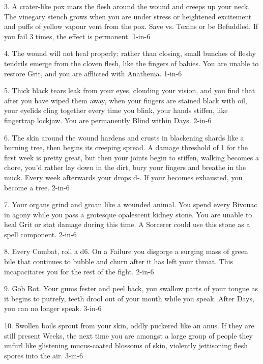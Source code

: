 3. A crater-like pox mars the flesh around the wound and creeps up your neck. The vinegary stench grows when you are under stress or heightened excitement and puffs of yellow vapour vent from the pox. Save vs. Toxins or be Befuddled.  If you fail 3 times, the effect is permanent. 1-in-6




4. The wound will not heal properly; rather than closing, small bunches of fleshy tendrils emerge from the cloven flesh, like the fingers of babies.  You are unable to restore Grit, and you are afflicted with Anathema. 1-in-6



5. Thick black tears leak from your eyes, clouding your vision, and you find that after you have wiped them away, when your fingers are stained black with oil, your eyelids cling together every time you blink, your hands stiffen, like fingertrap lockjaw.  You are permanently Blind within Days. 2-in-6



6. The skin around the wound hardens and crusts in blackening shards like a burning tree, then begins its creeping spread. A damage threshold of 1 for the first week is pretty great, but then your joints begin to stiffen, walking becomes a chore, you'd rather lay down in the dirt, bury your fingers and breathe in the muck. Every week afterwards your \MD drops {d-}.  If your \MD becomes exhausted, you become a tree. 2-in-6



7. Your organs grind and groan like a wounded animal. You spend every Bivouac in agony while you pass a grotesque opalescent kidney stone. You are unable to heal Grit or stat damage during this time. A Sorcerer could use this stone as a spell component. 2-in-6



8. Every Combat, roll a d6.  On a Failure you disgorge a surging mass of green bile that continues to bubble and churn after it has left your throat.  This incapacitates you for the rest of the fight. 2-in-6



9. Gob Rot. Your gums fester and peel back, you swallow parts of your tongue as it begins to putrefy, teeth drool out of your mouth while you speak.  After Days, you can no longer speak. 3-in-6



10. Swollen boils sprout from your skin, oddly puckered like an anus. If they are still present Weeks, the next time you are amongst a large group of people they unfurl like glistening mucus-coated blossoms of skin, violently jettisoning flesh spores into the air. 3-in-6



